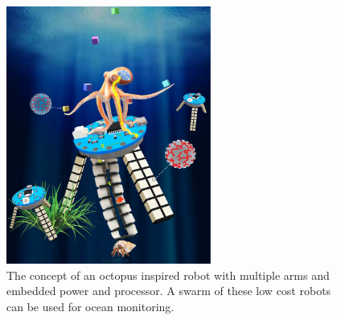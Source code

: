 \begin{figure}[!th]
\centering
\includegraphics[width=0.6\textwidth]{3Doctopus.pdf}
    \caption[Miniature octopus inspired soft robot]{The concept of an octopus inspired robot with multiple arms and embedded power and processor. A swarm of these low cost robots can be used for ocean monitoring.}
    \label{fig:3Doctopus}
\end{figure}
